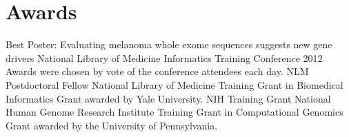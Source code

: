 \documentclass [10pt, letterpaper]{moderncv}
\begin{document}
\section {Awards}
         {Best Poster: Evaluating melanoma whole exome sequences suggests new gene drivers}
         {National Library of Medicine Informatics Training Conference 2012}
         {}
         {}
         {Awards were chosen by vote of the conference attendees each day.}
         {NLM Postdoctoral Fellow}
         {National Library of Medicine Training Grant
          in Biomedical Informatics}
         {}
         {}
         {Grant awarded by Yale University.}
         {NIH Training Grant}
         {National Human Genome Research Institute Training Grant
          in Computational Genomics}
         {}
         {}
         {Grant awarded by the University of Pennsylvania.}




\end{document}
